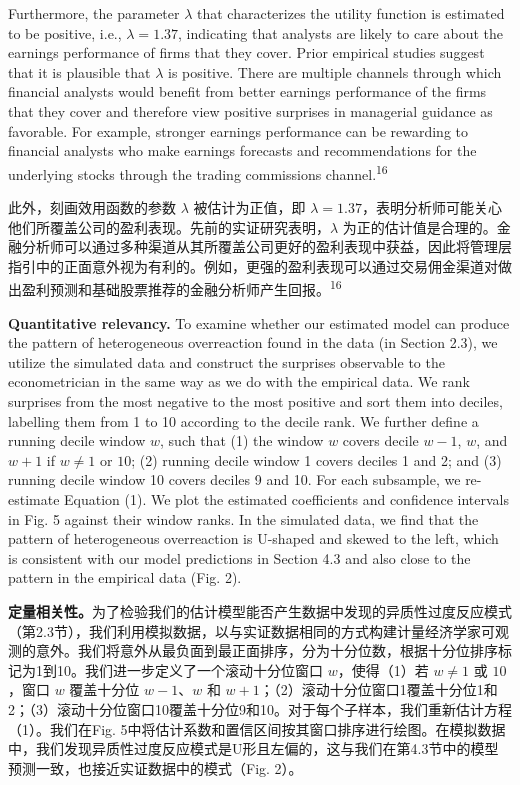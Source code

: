 \documentclass[12pt,a4paper]{article}
\newenvironment{original}
  {\par\medskip\noindent\ignorespaces}
  {\par\medskip}
\newenvironment{translation}
  {\par\noindent{\color{transblue}\ignorespaces}}
  {\par\bigskip}
\begin{document}
\begin{original}
Furthermore, the parameter $\lambda$ that characterizes the utility function is estimated to be positive, i.e., $\lambda = 1.37$, indicating that analysts are likely to care about the earnings performance of firms that they cover. Prior empirical studies suggest that it is plausible that $\lambda$ is positive. There are multiple channels through which financial analysts would benefit from better earnings performance of the firms that they cover and therefore view positive surprises in managerial guidance as favorable. For example, stronger earnings performance can be rewarding to financial analysts who make earnings forecasts and recommendations for the underlying stocks through the trading commissions channel.\textsuperscript{16}
\end{original}
\begin{translation}
此外，刻画效用函数的参数 $\lambda$ 被估计为正值，即 $\lambda = 1.37$，表明分析师可能关心他们所覆盖公司的盈利表现。先前的实证研究表明，$\lambda$ 为正的估计值是合理的。金融分析师可以通过多种渠道从其所覆盖公司更好的盈利表现中获益，因此将管理层指引中的正面意外视为有利的。例如，更强的盈利表现可以通过交易佣金渠道对做出盈利预测和基础股票推荐的金融分析师产生回报。\textsuperscript{16}
\end{translation}

\begin{original}
\textbf{Quantitative relevancy.} To examine whether our estimated model can produce the pattern of heterogeneous overreaction found in the data (in Section 2.3), we utilize the simulated data and construct the surprises observable to the econometrician in the same way as we do with the empirical data. We rank surprises from the most negative to the most positive and sort them into deciles, labelling them from 1 to 10 according to the decile rank. We further define a running decile window $w$, such that (1) the window $w$ covers decile $w-1$, $w$, and $w+1$ if $w \neq 1$ or $10$; (2) running decile window 1 covers deciles 1 and 2; and (3) running decile window 10 covers deciles 9 and 10. For each subsample, we re-estimate Equation (1). We plot the estimated coefficients and confidence intervals in Fig. 5 against their window ranks. In the simulated data, we find that the pattern of heterogeneous overreaction is U-shaped and skewed to the left, which is consistent with our model predictions in Section 4.3 and also close to the pattern in the empirical data (Fig. 2).
\end{original}
\begin{translation}
\textbf{定量相关性。}为了检验我们的估计模型能否产生数据中发现的异质性过度反应模式（第2.3节），我们利用模拟数据，以与实证数据相同的方式构建计量经济学家可观测的意外。我们将意外从最负面到最正面排序，分为十分位数，根据十分位排序标记为1到10。我们进一步定义了一个滚动十分位窗口 $w$，使得（1）若 $w \neq 1$ 或 $10$，窗口 $w$ 覆盖十分位 $w-1$、$w$ 和 $w+1$；（2）滚动十分位窗口1覆盖十分位1和2；（3）滚动十分位窗口10覆盖十分位9和10。对于每个子样本，我们重新估计方程（1）。我们在Fig. 5中将估计系数和置信区间按其窗口排序进行绘图。在模拟数据中，我们发现异质性过度反应模式是U形且左偏的，这与我们在第4.3节中的模型预测一致，也接近实证数据中的模式（Fig. 2）。
\end{translation}
\end{document}
